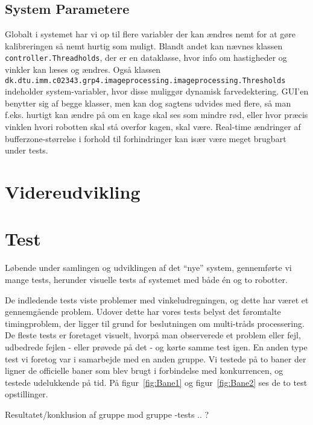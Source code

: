 \subsection{System Parametere}
Globalt i systemet har vi op til flere variabler der kan ændres nemt for at gøre kalibreringen så nemt hurtig som muligt. Blandt andet kan nævnes klassen \texttt{controller.Threadholds}, der er en dataklasse, hvor info om hastigheder og vinkler kan læses og ændres. Også klassen \texttt{dk.dtu.imm.c02343.grp4.imageprocessing.imageprocessing.Thresholds} indeholder system-variabler, hvor disse muliggør dynamisk farvedektering. GUI’en benytter sig af begge klasser, men kan dog sagtens udvides med flere, så man f.eks. hurtigt kan ændre på om en kage skal ses som mindre rød, eller hvor præcis vinklen hvori robotten skal stå overfor kagen, skal være. Real-time ændringer af bufferzone-størrelse i forhold til forhindringer kan især være meget brugbart under tests.


\section{Videreudvikling}

\section{Test}
Løbende under samlingen og udviklingen af det “nye” system, gennemførte vi mange tests, herunder visuelle tests af systemet med både én og to robotter.

De indledende tests viste problemer med vinkeludregningen, og dette har været et gennemgående problem. Udover dette har vores tests belyst det føromtalte timingproblem, der ligger til grund for beslutningen om multi-tråds processering. De fleste tests er foretaget visuelt, hvorpå man observerede et problem eller fejl, udbedrede fejlen - eller prøvede på det - og kørte samme test igen.
En anden type test vi foretog var i samarbejde med en anden gruppe. Vi testede på to baner der ligner de officielle baner som blev brugt i forbindelse med konkurrencen, og testede udelukkende på tid. På figur~\vref{fig:Bane1} og figur~\vref{fig:Bane2} ses de to test opstillinger.



Resultatet/konklusion af gruppe mod gruppe -tests .. ?
